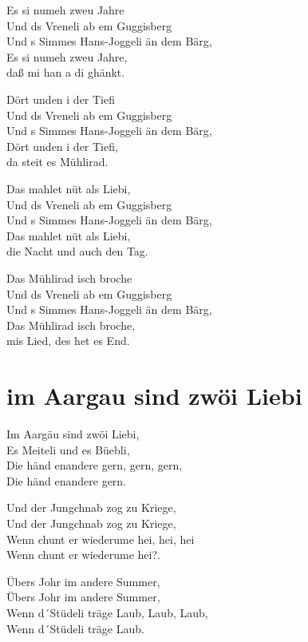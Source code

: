 \documentclass[
  letterpaper,
]{scrbook}
\begin{document}
Es si numeh zweu Jahre\\
Und ds Vreneli ab em Guggisberg\\
Und s Simmes Hans-Joggeli än dem Bärg,\\
Es si numeh zweu Jahre,\\
daß mi han a di ghänkt.

Dört unden i der Tiefi\\
Und ds Vreneli ab em Guggisberg\\
Und s Simmes Hans-Joggeli än dem Bärg,\\
Dört unden i der Tiefi,\\
da steit es Mühlirad.

Das mahlet nüt als Liebi,\\
Und ds Vreneli ab em Guggisberg\\
Und s Simmes Hans-Joggeli än dem Bärg,\\
Das mahlet nüt als Liebi,\\
die Nacht und auch den Tag.

Das Mühlirad isch broche\\
Und ds Vreneli ab em Guggisberg\\
Und s Simmes Hans-Joggeli än dem Bärg,\\
Das Mühlirad isch broche,\\
mis Lied, des het es End.

\hypertarget{im-aargau-sind-zwuxf6i-liebi}{%
\chapter{im Aargau sind zwöi Liebi}\label{im-aargau-sind-zwuxf6i-liebi}}

Im Aargäu sind zwöi Liebi,\\
Es Meiteli und es Büebli,\\
Die händ enandere gern, gern, gern,\\
Die händ enandere gern.

Und der Jungchnab zog zu Kriege,\\
Und der Jungchnab zog zu Kriege,\\
Wenn chunt er wiederume hei, hei, hei\\
Wenn chunt er wiederume hei?.

Übers Johr im andere Summer,\\
Übers Johr im andere Summer,\\
Wenn d´Stüdeli träge Laub, Laub, Laub,\\
Wenn d´Stüdeli träge Laub.
\end{document}
